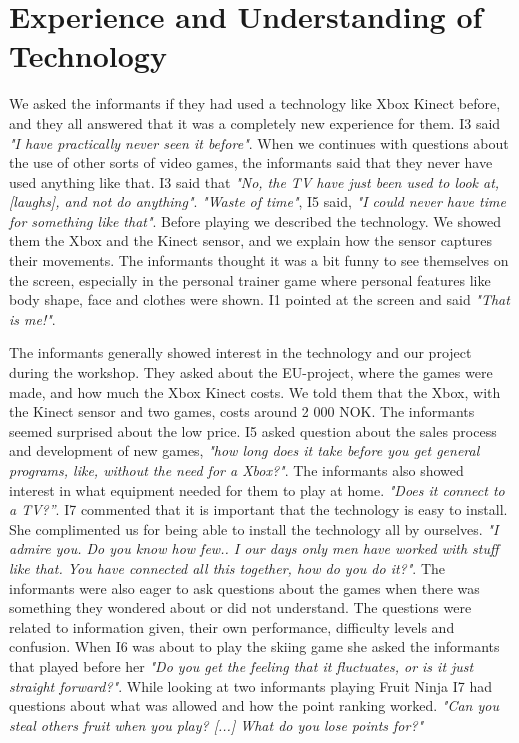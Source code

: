 \section{Experience and Understanding of Technology}
We asked the informants if they had used a technology like Xbox Kinect before, and they all answered that it was a completely new experience for them. I3 said \emph{"I have practically never seen it before"}. When we continues with questions about the use of other sorts of video games, the informants said that they never have used anything like that. I3 said that \emph{"No, the TV have just been used to look at, [laughs], and not do anything"}. \emph{"Waste of time"}, I5 said, \emph{"I could never have time for something like that"}.  Before playing we described the technology. We showed them the Xbox and the Kinect sensor, and we explain how the sensor captures their movements. The informants thought it was a bit funny to see themselves on the screen, especially in the personal trainer game where personal features like body shape, face and clothes were shown. I1 pointed at the screen and said \emph{"That is me!"}. 

The informants generally showed interest in the technology and our project during the workshop. They asked about the EU-project, where the games were made, and how much the Xbox Kinect costs. We told them that the Xbox, with the Kinect sensor and two games, costs around 2 000 NOK. The informants seemed surprised about the low price. I5 asked question about the sales process and development of new games, \emph{"how long does it take before you get general programs, like, without the need for a Xbox?"}. The informants also showed interest in what equipment needed for them to play at home. \emph{"Does it connect to a TV?”}. I7 commented that it is important that the technology is easy to install. She complimented us for being able to install the technology all by ourselves. \emph{"I admire you. Do you know how few.. I our days only men have worked with stuff like that. You have connected all this together, how do you do it?"}.  The informants were also eager to ask questions about the games when there was something they wondered about or did not understand. The questions were related to information given, their own performance, difficulty levels and confusion. When I6 was about to play the skiing game she asked the informants that played before her \emph{"Do you get the feeling that it fluctuates, or is it just straight forward?"}. While looking at two informants playing Fruit Ninja I7 had questions about what was allowed and how the point ranking worked. \emph{"Can you steal others fruit when you play? [...] What do you lose points for?"} 

